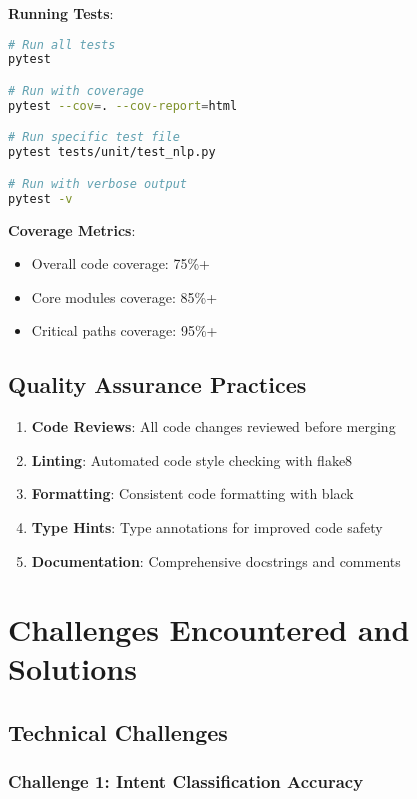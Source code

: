\documentclass[12pt,a4paper]{article}
\begin{document}
\textbf{Running Tests}:
\begin{lstlisting}[language=bash, caption=Test Execution Commands]
# Run all tests
pytest

# Run with coverage
pytest --cov=. --cov-report=html

# Run specific test file
pytest tests/unit/test_nlp.py

# Run with verbose output
pytest -v
\end{lstlisting}

\textbf{Coverage Metrics}:
\begin{itemize}[leftmargin=*]
    \item Overall code coverage: 75\%+
    \item Core modules coverage: 85\%+
    \item Critical paths coverage: 95\%+
\end{itemize}

\subsection{Quality Assurance Practices}

\begin{enumerate}[leftmargin=*]
    \item \textbf{Code Reviews}: All code changes reviewed before merging
    \item \textbf{Linting}: Automated code style checking with flake8
    \item \textbf{Formatting}: Consistent code formatting with black
    \item \textbf{Type Hints}: Type annotations for improved code safety
    \item \textbf{Documentation}: Comprehensive docstrings and comments
\end{enumerate}

\section{Challenges Encountered and Solutions}

\subsection{Technical Challenges}

\subsubsection{Challenge 1: Intent Classification Accuracy}
\end{document}
